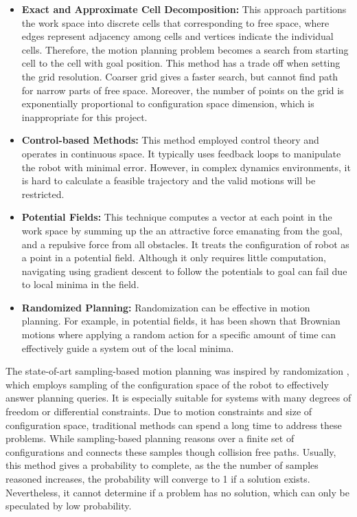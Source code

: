 \begin{itemize}
    \item \textbf{Exact and Approximate Cell Decomposition:} This approach partitions the work space into discrete cells that corresponding to free space, where edges represent adjacency among cells and vertices indicate the individual cells. Therefore, the motion planning problem becomes a search from starting cell to the cell with goal position. This method has a trade off when setting the grid resolution. Coarser grid gives a faster search, but cannot find path for narrow parts of free space. Moreover, the number of points on the grid is exponentially proportional to configuration space dimension, which is inappropriate for this project.
    
    \item \textbf{Control-based Methods:} This method employed control theory and operates in continuous space. It typically uses feedback loops to manipulate the robot with minimal error. However, in complex dynamics environments, it is hard to calculate a feasible trajectory and the valid motions will be restricted.
    
    \item \textbf{Potential Fields:} This technique computes a vector at each point in the work space by summing up the an attractive force emanating from the goal, and a repulsive force from all obstacles. It treats the configuration of robot as a point in a potential field. Although it only requires little computation, navigating using gradient descent to follow the potentials to goal can fail due to local minima in the field.
    
    \item \textbf{Randomized Planning:} Randomization can be effective in motion planning. For example, in potential fields, it has been shown that Brownian motions where applying a random action for a specific amount of time can effectively guide a system out of the local minima.
\end{itemize}

The state-of-art sampling-based motion planning was inspired by randomization \citep{OMPLPrim20:online}, which employs sampling of the configuration space of the robot to effectively answer planning queries. It is especially suitable for systems with many degrees of freedom or differential constraints. Due to motion constraints and size of configuration space, traditional methods can spend a long time to address these problems. While sampling-based planning reasons over a finite set of configurations and connects these samples though collision free paths. Usually, this method gives a probability to complete, as the the number of samples reasoned increases, the probability will converge to 1 if a solution exists. Nevertheless, it cannot determine if a problem has no solution, which can only be speculated by low probability. 

